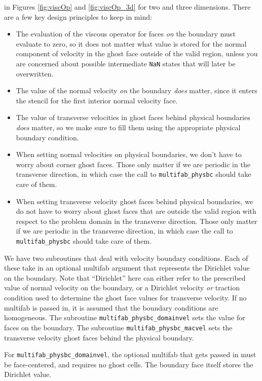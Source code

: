 \documentclass[final]{siamltex}
\begin{document}
in Figures \ref{fig:viscOp} and \ref{fig:viscOp_3d} for two and three dimensions.
There are a few key design principles to keep in mind:
\begin{itemize}
\item The evaluation of the viscous operator for faces {\it on} the boundary must
evaluate to zero, so it does not matter what value is stored for the normal component
of velocity in the ghost face outside of the valid region, unless you are concerned 
about possible intermediate {\tt NaN} states that will later be overwritten.
\item The value of the normal velocity {\it on} the boundary {\it does} matter, since it
enters the stencil for the first interior normal velocity face.
\item The value of transverse velocities in ghost faces behind physical boundaries
{\it does} matter, so we make sure to fill them using the appropriate physical 
boundary condition.
\item When setting normal velocities on physical boundaries, we don't have to worry
about corner ghost faces.  Those only matter if we are periodic in the transverse
direction, in which case the call to {\tt multifab\_physbc} should take care of them.
\item When setting transverse velocity ghost faces behind physical boundaries, we do
not have to worry about ghost faces that are outside the valid region with respect
to the problem domain in the transverse direction.  Those only matter if we are 
periodic in the transverse direction, in which case the call to {\tt multifab\_physbc} 
should take care of them.
\end{itemize}

We have two subroutines that deal with velocity boundary conditions.  Each of these
take in an optional multifab argument that represents the Dirichlet value on the
boundary.  Note that ``Dirichlet'' here can either refer to the prescribed value
of normal velocity on the boundary, or a Dirichlet velocity {\it or} traction
condition used to determine the ghost face values for transverse velocity.
If no multifab is passed in, it is assumed that the boundary conditions
are homogeneous.  The subroutine {\tt multifab\_physbc\_domainvel} sets the 
value for faces on the boundary.  The subroutine {\tt multifab\_physbc\_macvel}
sets the transverse velocity ghost faces behind the physical boundary.

For {\tt multifab\_physbc\_domainvel}, the optional multifab that gets passed in
must be face-centered, and requires no ghost cells.  The boundary face itself
stores the Dirichlet value.
\end{document}
